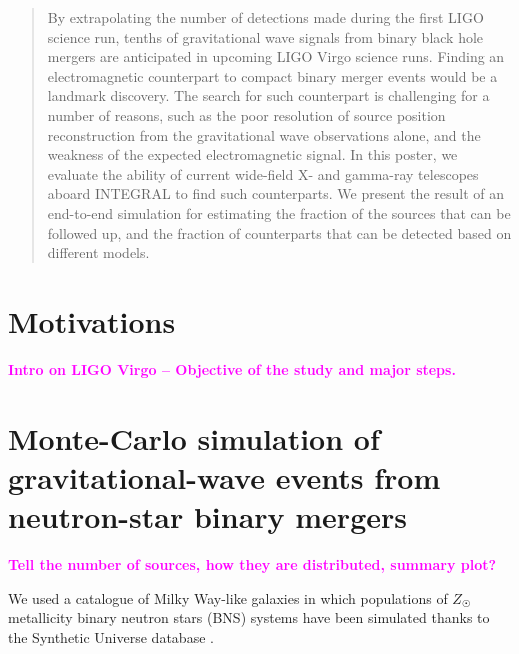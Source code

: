 \documentclass[a0,portrait]{a0poster}
\newcommand{\ECM}[1] {\textbf{\textcolor{magenta}{#1}}}
\begin{document}
\begin{multicols}{2} %


 \begin{abstract}
   By extrapolating the number of detections made during the first LIGO science
   run, tenths of gravitational wave signals from binary black hole mergers are
   anticipated in upcoming LIGO Virgo science runs. Finding an electromagnetic
   counterpart to compact binary merger events would be a landmark
   discovery. The search for such counterpart is challenging for a number of
   reasons, such as the poor resolution of source position reconstruction from
   the gravitational wave observations alone, and the weakness of the expected
   electromagnetic signal. In this poster, we evaluate the ability of current
   wide-field X- and gamma-ray telescopes aboard INTEGRAL to find such
   counterparts. We present the result of an end-to-end simulation for
   estimating the fraction of the sources that can be followed up, and the
   fraction of counterparts that can be detected based on different models.
 \end{abstract}


\section*{Motivations}

\ECM{Intro on LIGO Virgo -- Objective of the study and major steps.}

\section*{Monte-Carlo simulation of gravitational-wave events from neutron-star binary mergers}

\ECM{Tell the number of sources, how they are distributed, summary plot?}

We used a catalogue of Milky Way-like galaxies in which populations of
$Z_{\astrosun}$ metallicity binary neutron stars (BNS) systems have been
simulated thanks to the Synthetic Universe database
\cite{dominik12:_doubl_compac_objec}. 


\end{multicols}
\end{document}
